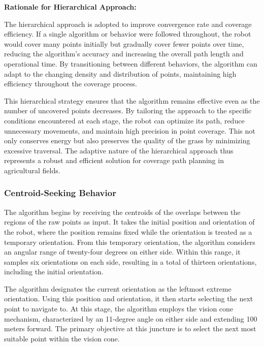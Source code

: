 \textbf{Rationale for Hierarchical Approach: } 

\vspace*{6mm}   


The hierarchical approach is adopted to improve convergence rate and coverage efficiency. If a single algorithm or behavior were followed throughout, the robot would cover many points initially but gradually cover fewer points over time, reducing the algorithm's accuracy and increasing the overall path length and operational time. By transitioning between different behaviors, the algorithm can adapt to the changing density and distribution of points, maintaining high efficiency throughout the coverage process.

\vspace*{6mm}   


This hierarchical strategy ensures that the algorithm remains effective even as the number of uncovered points decreases. By tailoring the approach to the specific conditions encountered at each stage, the robot can optimize its path, reduce unnecessary movements, and maintain high precision in point coverage. This not only conserves energy but also preserves the quality of the grass by minimizing excessive traversal. The adaptive nature of the hierarchical approach thus represents a robust and efficient solution for coverage path planning in agricultural fields. 

\vspace*{6mm}  





\subsubsection{Centroid-Seeking Behavior}


The algorithm begins by receiving the centroids of the overlaps between the regions of the raw points as input. It takes the initial position and orientation of the robot, where the position remains fixed while the orientation is treated as a temporary orientation. From this temporary orientation, the algorithm considers an angular range of twenty-four degrees on either side. Within this range, it samples six orientations on each side, resulting in a total of thirteen orientations, including the initial orientation. 

\vspace*{6mm}   

The algorithm designates the current orientation as the leftmost extreme orientation. Using this position and orientation, it then starts selecting the next point to navigate to. At this stage, the algorithm employs the vision cone mechanism, characterized by an 11-degree angle on either side and extending 100 meters forward. The primary objective at this juncture is to select the next most suitable point within the vision cone.

